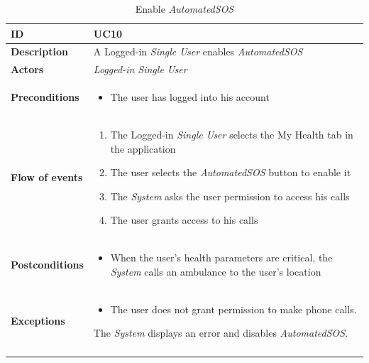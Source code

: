 \documentclass[titlepage]{article}
\begin{document}
\begin{longtable}{| p{3 cm} | p{10 cm} |} 
			\hline
			{\bf ID} & UC10 \\
			\hline
			{\bf Description} & A Logged-in {\it Single User} enables {\it AutomatedSOS}  \\
			\hline
			{\bf Actors} & {\it Logged-in {\it Single User} }\\
			\hline
			{\bf Preconditions} & 		
							\begin{itemize}
								\item The user has logged into his account
							\end{itemize}
			\\
			\hline
			{\bf Flow of events} & 
							\begin{enumerate}
								\item The Logged-in {\it Single User} selects the My Health tab in the application
\item The user selects the {\it AutomatedSOS} button to enable it
\item The {\it System} asks the user permission to access his calls
\item The user grants access to his calls

							\end{enumerate}
			
			 \\
			\hline
			{\bf Postconditions} & 
							\begin{itemize}
								\item When the user’s health parameters are critical, the {\it System} calls an ambulance to the user’s location

							\end{itemize}
			\\
			\hline
			{\bf Exceptions} & 
							\begin{itemize}
								\item The user does not grant permission to make phone calls.
							\end{itemize}
							The {\it System} displays an error and disables {\it AutomatedSOS}.							
			\\
			\hline
			\caption{Enable {\it AutomatedSOS}}
			\end{longtable}

\end{document}
